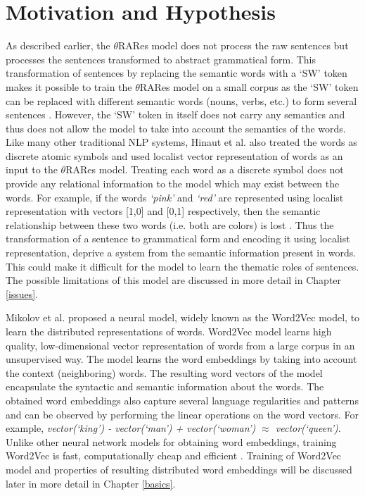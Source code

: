 \section{Motivation and Hypothesis}

As described earlier, the $\theta$RARes model does not process the raw sentences but processes the sentences transformed to abstract grammatical form. This transformation of sentences by replacing the semantic words with a `SW' token makes it possible to train the $\theta$RARes model on a small corpus as the `SW' token can be replaced with different semantic words (nouns, verbs, etc.) to form several sentences \cite{xavier:2013:RT}. However, the `SW' token in itself does not carry any semantics and thus does not allow the model to take into account the semantics of the words. Like many other traditional NLP systems, Hinaut et al. \cite{xavier:2013:RT} also treated the words as discrete atomic symbols and used localist vector representation of words as an input to the $\theta$RARes model. Treating each word as a discrete symbol does not provide any relational information to the model which may exist between the words. For example, if the words \textit{`pink'} and \textit{`red'} are represented using localist representation with vectors [1,0] and [0,1] respectively, then the semantic relationship between these two words (i.e. both are colors) is lost \cite{w2v:tensor_flow}. Thus the transformation of a sentence to grammatical form and encoding it using localist representation, deprive a system from the semantic information present in words. This could make it difficult for the model to learn the thematic roles of sentences. The possible limitations of this model are discussed in more detail in Chapter \ref{issues}.

Mikolov et al. \cite{w2v:mikolov_2013_distributed} proposed a neural model, widely known as the Word2Vec model, to learn the distributed representations of words. Word2Vec model learns high quality, low-dimensional vector representation of words from a large corpus in an unsupervised way. The model learns the word embeddings by taking into account the context (neighboring) words. The resulting word vectors of the model encapsulate the syntactic and semantic information about the words. The obtained word embeddings also capture several language regularities and patterns \cite{w2v:language_similarities, w2v:mikolov_2013_distributed} and can be observed by performing the linear operations on the word vectors. For example, \textit{vector(`king') - vector(`man') + vector(`woman') $\approx$ vector(`queen')}. Unlike other neural network models \cite{w2v:glove, srl:collobert:2008, word_vec:turian:2010, word_vec:hinton:2009} for obtaining word embeddings, training Word2Vec is fast, computationally cheap and efficient \cite{w2v:mikolov_2013_distributed}. Training of Word2Vec model and properties of resulting distributed word embeddings will be discussed later in more detail in Chapter \ref{basics}.

